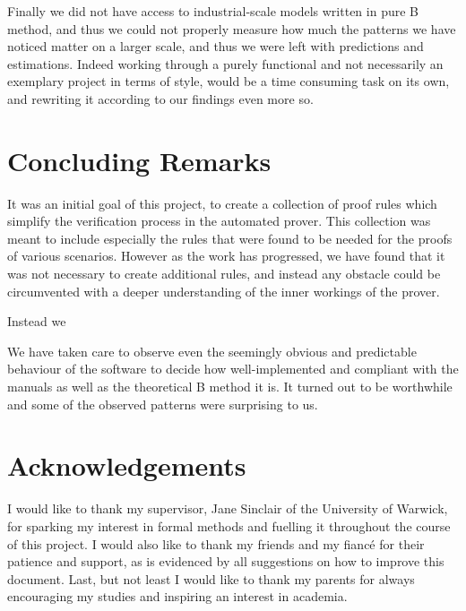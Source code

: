 \documentclass[11pt,journal]{IEEEtran}
\begin{document}
	Finally we did not have access to industrial-scale models written in pure B method, and thus we could not properly measure how much the patterns we have noticed matter on a larger scale, and thus we were left with predictions and estimations. Indeed working through a purely functional and not necessarily an exemplary project in terms of style, would be a time consuming task on its own, and rewriting it according to our findings even more so. 
	
	\section{Concluding Remarks}

	It was an initial goal of this project, to create a collection of proof rules which simplify the verification process in the automated prover. This collection was meant to include especially the rules that were found to be needed for the proofs of various scenarios. However as the work has progressed, we have found that it was not necessary to create additional rules, and instead any obstacle could be circumvented with a deeper understanding of the inner workings of the prover.
	
	Instead we 
	
	We have taken care to observe even the seemingly obvious and predictable behaviour of the software to decide how well-implemented and compliant with the manuals as well as the theoretical B method it is. It turned out to be worthwhile and some of the observed patterns were surprising to us.

	
	\section{Acknowledgements}
	I would like to thank my supervisor, Jane Sinclair of the University of Warwick, for sparking my interest in formal methods and fuelling it throughout the course of this project. I would also like to thank my friends and my fianc\'{e} for their patience and support, as is evidenced by all suggestions on how to improve this document. Last, but not least I would like to thank my parents for always encouraging my studies and inspiring an interest in academia.
	
	\IEEEPARstart{}{} 
	\pagebreak
\end{document}
